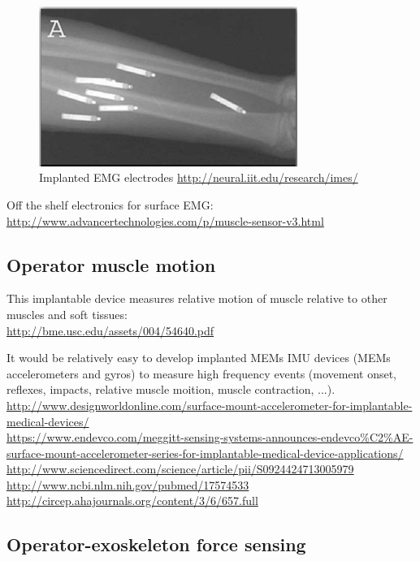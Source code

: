 \documentclass[letterpaper,12pt,fullpage]{article}
\begin{document}
\begin{figure}
\centering
\includegraphics[width=0.75\textwidth]{figs/emg.png}
\caption{Implanted EMG electrodes \url{http://neural.iit.edu/research/imes/}}
\label{f:emg}
\end{figure}

Off the shelf electronics for surface EMG:\\
\url{http://www.advancertechnologies.com/p/muscle-sensor-v3.html}

\subsection{Operator muscle motion}

This implantable device measures relative motion of muscle relative
to other muscles and soft tissues:\\
\url{http://bme.usc.edu/assets/004/54640.pdf}

It would be relatively easy to develop implanted MEMs IMU devices (MEMs accelerometers
and gyros) to measure high frequency events (movement onset, reflexes,
impacts, relative muscle moition, muscle contraction, ...).\\
\url{http://www.designworldonline.com/surface-mount-accelerometer-for-implantable-medical-devices/}\\
\url{https://www.endevco.com/meggitt-sensing-systems-announces-endevco\%C2\%AE-surface-mount-accelerometer-series-for-implantable-medical-device-applications/}\\
\url{http://www.sciencedirect.com/science/article/pii/S0924424713005979}\\
\url{http://www.ncbi.nlm.nih.gov/pubmed/17574533}\\
\url{http://circep.ahajournals.org/content/3/6/657.full}\\

\subsection{Operator-exoskeleton force sensing}
\end{document}
